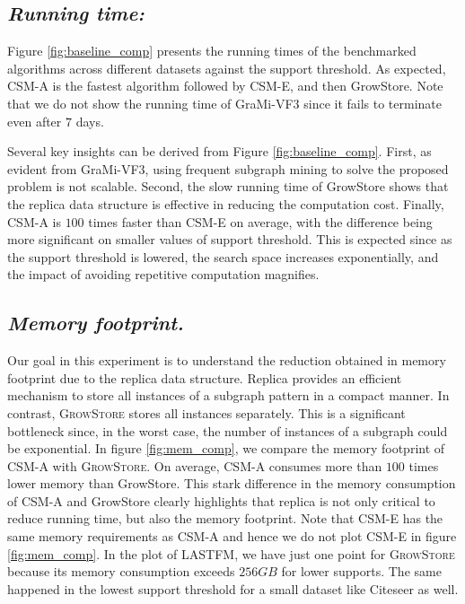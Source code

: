 \subsection{\textit{Running time:}} Figure \ref{fig:baseline_comp} presents the running times of the benchmarked algorithms across different datasets against the support threshold. %
As expected, CSM-A is the fastest algorithm followed by CSM-E, and then GrowStore. Note that we do not show the running time of GraMi-VF3 since it fails to terminate even after $7$ days. 

Several key insights can be derived from Figure \ref{fig:baseline_comp}. First, as evident from GraMi-VF3, using frequent subgraph mining to solve the proposed problem is not scalable. Second, the slow running time of GrowStore shows that the replica data structure is effective in reducing the computation cost. Finally, CSM-A is $100$ times faster than CSM-E on average, with the difference being more significant on smaller values of support threshold. This is expected since as the support threshold is lowered, the search space increases exponentially, and the impact of avoiding repetitive computation magnifies.

\subsection{\textit{Memory footprint.}} Our goal in this experiment is to understand the reduction obtained in memory footprint due to the replica data structure. Replica provides an efficient mechanism to store all instances of a subgraph pattern in a compact manner. In contrast, \textsc{GrowStore} stores all instances separately. This is a significant bottleneck since, in the worst case, the number of instances of a subgraph could be exponential. %
In figure \ref{fig:mem_comp}, we compare the memory footprint of \textsc{CSM-A} with \textsc{GrowStore}. On average, CSM-A consumes more than $100$ times lower memory than GrowStore. This stark difference in the memory consumption of CSM-A and GrowStore clearly highlights that replica is not only critical to reduce running time, but also the memory footprint. Note that CSM-E has the same memory requirements as CSM-A and hence we do not plot CSM-E in figure \ref{fig:mem_comp}. In the plot of LASTFM, we have just one point for \textsc{GrowStore} because its memory consumption exceeds $256 GB$  for lower supports. The same happened in the lowest support threshold for a small dataset like Citeseer as well. 

